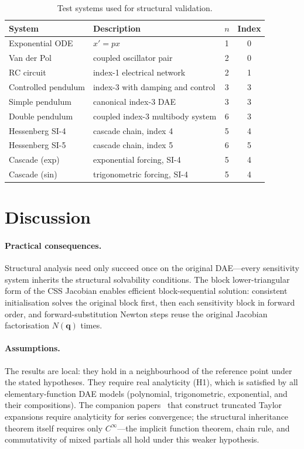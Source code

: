 \documentclass[12pt,a4paper]{article}
\theoremstyle{definition}
\theoremstyle{plain}
\theoremstyle{remark}
\newcommand{\vq}{\mathbf{q}}
\begin{document}
\begin{table}[htbp]
  \centering
  \caption{Test systems used for structural validation.}
  \label{tab:test_systems}
  \small
  \begin{tabular}{llcc}
    \toprule
    System & Description & $n$ & Index \\
    \midrule
    Exponential ODE & $x' = px$ & 1 & 0 \\
    Van der Pol & coupled oscillator pair & 2 & 0 \\
    RC circuit & index-1 electrical network & 2 & 1 \\
    Controlled pendulum & index-3 with damping and control & 3 & 3 \\
    Simple pendulum & canonical index-3 DAE & 3 & 3 \\
    Double pendulum & coupled index-3 multibody system & 6 & 3 \\
    Hessenberg SI-4 & cascade chain, index 4 & 5 & 4 \\
    Hessenberg SI-5 & cascade chain, index 5 & 6 & 5 \\
    Cascade (exp) & exponential forcing, SI-4 & 5 & 4 \\
    Cascade (sin) & trigonometric forcing, SI-4 & 5 & 4 \\
    \bottomrule
  \end{tabular}
\end{table}

\section{Discussion}

\paragraph{Practical consequences.}
Structural analysis need only succeed once on the original DAE---every sensitivity system inherits the structural solvability conditions. The block lower-triangular form of the CSS Jacobian enables efficient block-sequential solution: consistent initialisation solves the original block first, then each sensitivity block in forward order, and forward-substitution Newton steps reuse the original Jacobian factorisation $N(\vq)$ times.

\paragraph{Assumptions.}
The results are local: they hold in a neighbourhood of the reference point under the stated hypotheses. They require real analyticity (H1), which is satisfied by all elementary-function DAE models (polynomial, trigonometric, exponential, and their compositions). The companion papers~\cite{cao2026builder} that construct truncated Taylor expansions require analyticity for series convergence; the structural inheritance theorem itself requires only $C^\infty$---the implicit function theorem, chain rule, and commutativity of mixed partials all hold under this weaker hypothesis.
\end{document}
